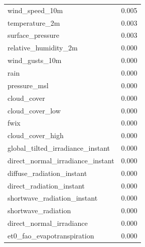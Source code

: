 \begin{table}[H]
\begin{tabular}{lc}
		wind\_speed\_10m                        & 0.005       \\ 
		temperature\_2m                         & 0.003       \\ 
		surface\_pressure                       & 0.003       \\ 
		relative\_humidity\_2m                  & 0.000       \\ 
		wind\_gusts\_10m                        & 0.000       \\ 
		rain                                  & 0.000       \\ 
		pressure\_msl                          & 0.000       \\ 
		cloud\_cover                           & 0.000       \\ 
		cloud\_cover\_low                      & 0.000       \\ 
		fwix                                       & 0.000       \\ 
		cloud\_cover\_high                     & 0.000       \\ 
		global\_tilted\_irradiance\_instant      & 0.000       \\ 
		direct\_normal\_irradiance\_instant     & 0.000       \\ 
		diffuse\_radiation\_instant             & 0.000       \\ 
		direct\_radiation\_instant             & 0.000       \\ 
		shortwave\_radiation\_instant          & 0.000       \\ 
		shortwave\_radiation                   & 0.000       \\ 
		direct\_normal\_irradiance            & 0.000       \\ 
		et0\_fao\_evapotranspiration         & 0.000       \\ 
	\end{tabular}
\end{table}


